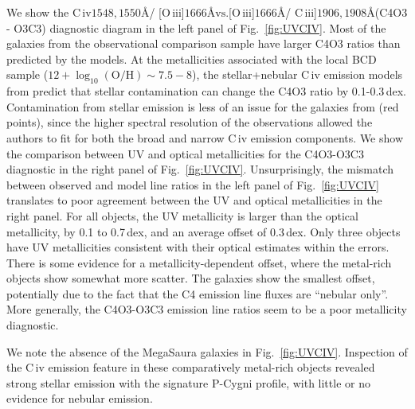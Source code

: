 \documentclass[preprint2]{aastex62}
\newcommand{\oiii}{[O\,{\sc iii}]\xspace}
\newcommand{\civ}{C\,{\sc iv}\xspace}
\newcommand{\ciii}{C\,{\sc iii}]\xspace}
\newcommand\vs{\ensuremath{\mathrm{vs.}}\xspace}
\newcommand{\logten}{\ensuremath{\log_{10}}}
\newcommand{\logOH}{\ensuremath{\logten (\mathrm{O}/\mathrm{H})}\xspace}
\newcommand{\ang}{\ensuremath{\mbox{\AA}}\xspace}
\newcommand{\mage}{{\sc Meg}a{\sc S}a{\sc ura}\xspace}
\begin{document}
We show the \civ$1548,1550$\ang / \oiii$1666$\ang \vs \oiii$1666$\ang / \ciii$1906,1908$\ang (C4O3 - O3C3) diagnostic diagram in the left panel of Fig.~\ref{fig:UVCIV}. Most of the galaxies from the observational comparison sample have larger C4O3 ratios than predicted by the models. At the metallicities associated with the local BCD sample ($12+\logOH \sim 7.5-8$), the stellar+nebular \civ emission models from \citet{Byler+2018} predict that stellar contamination can change the C4O3 ratio by 0.1-0.3\,dex. Contamination from stellar emission is less of an issue for the galaxies from \citet{Senchyna+2017} (red points), since the higher spectral resolution of the observations allowed the authors to fit for both the broad and narrow \civ emission components. 
We show the comparison between UV and optical metallicities for the C4O3-O3C3 diagnostic in the right panel of Fig.~\ref{fig:UVCIV}. Unsurprisingly, the mismatch between observed and model line ratios in the left panel of Fig.~\ref{fig:UVCIV} translates to poor agreement between the UV and optical metallicities in the right panel. For all objects, the UV metallicity is larger than the optical metallicity, by 0.1 to 0.7\,dex, and an average offset of 0.3\,dex. Only three objects have UV metallicities consistent with their optical estimates within the errors. There is some evidence for a metallicity-dependent offset, where the metal-rich objects show somewhat more scatter. The \citet{Senchyna+2017} galaxies show the smallest offset, potentially due to the fact that the C4 emission line fluxes are ``nebular only''. More generally, the C4O3-O3C3 emission line ratios seem to be a poor metallicity diagnostic.

We note the absence of the \mage galaxies in Fig.~\ref{fig:UVCIV}. Inspection of the \civ emission feature in these comparatively metal-rich objects revealed strong stellar emission with the signature P-Cygni profile, with little or no evidence for nebular emission. 
\end{document}
